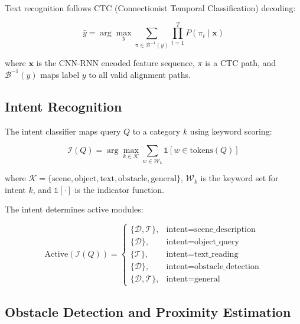 Text recognition follows CTC (Connectionist Temporal Classification) decoding:

\begin{equation}
\hat{y} = \arg\max_{y} \sum_{\pi \in \mathcal{B}^{-1}(y)} \prod_{t=1}^{T} P(\pi_t \mid \mathbf{x})
\end{equation}

where $\mathbf{x}$ is the CNN-RNN encoded feature sequence, $\pi$ is a CTC path, and $\mathcal{B}^{-1}(y)$ maps label $y$ to all valid alignment paths.

\subsection{Intent Recognition}

The intent classifier maps query $Q$ to a category $k$ using keyword scoring:

\begin{equation}
\mathcal{I}(Q) = \arg\max_{k \in \mathcal{K}} \sum_{w \in \mathcal{W}_k} \mathbb{1}[w \in \text{tokens}(Q)]
\end{equation}

where $\mathcal{K} = \{\text{scene}, \text{object}, \text{text}, \text{obstacle}, \text{general}\}$, $\mathcal{W}_k$ is the keyword set for intent $k$, and $\mathbb{1}[\cdot]$ is the indicator function.

The intent determines active modules:

\begin{equation}
\text{Active}(\mathcal{I}(Q)) = 
\begin{cases}
    \{\mathcal{D}, \mathcal{T}\}, & \text{intent} = \text{scene\_description} \\
    \{\mathcal{D}\},              & \text{intent} = \text{object\_query} \\
    \{\mathcal{T}\},              & \text{intent} = \text{text\_reading} \\
    \{\mathcal{D}\},              & \text{intent} = \text{obstacle\_detection} \\
    \{\mathcal{D}, \mathcal{T}\}, & \text{intent} = \text{general}
\end{cases}
\end{equation}

\subsection{Obstacle Detection and Proximity Estimation}


